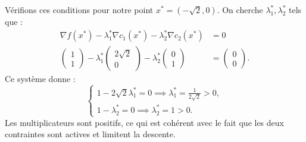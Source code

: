 Vérifions ces conditions pour notre point $x^* = (-\sqrt{2}, 0)$.
On cherche $\lambda_1^*, \lambda_2^*$ tels que :
\begin{align*}
    \nabla f(x^*) - \lambda_1^* \nabla c_1(x^*) - \lambda_2^* \nabla c_2(x^*) &= 0 \\
    \begin{pmatrix} 1 \\ 1 \end{pmatrix} - \lambda_1^* \begin{pmatrix} 2\sqrt{2} \\ 0 \end{pmatrix} - \lambda_2^* \begin{pmatrix} 0 \\ 1 \end{pmatrix} &= \begin{pmatrix} 0 \\ 0 \end{pmatrix}.
\end{align*}
Ce système donne :
\begin{equation}
    \begin{cases}
        1 - 2\sqrt{2} \lambda_1^* = 0 \implies \lambda_1^* = \frac{1}{2\sqrt{2}} > 0, \\
        1 - \lambda_2^* = 0 \implies \lambda_2^* = 1 > 0.
    \end{cases}
\end{equation}
Les multiplicateurs sont positifs, ce qui est cohérent avec le fait que les deux contraintes sont actives et limitent la descente.
